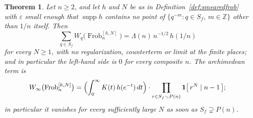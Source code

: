 \documentclass[11pt]{amsart}
\newtheorem{theorem}{Theorem}[section]
\theoremstyle{definition}
\theoremstyle{remark}
\newcommand{\Z}{\mathbb Z}
\newcommand{\Frob}{\operatorname{Frob}}
\newcommand{\supp}{\operatorname{supp}}
\begin{document}
\begin{theorem}\label{thm:frobcontact}
Let $n\ge2$, and let $h$ and $N$ be as in Definition~\ref{def:smearedfrob}
with $\varepsilon$ small enough that $\supp h$ contains no point of
$\{q^{-m}:q\in S_f,\ m\in\Z\}$ other than $1/n$ itself. Then
\begin{equation}\label{eq:frobcontacteq}
  \sum_{q\in S_f}W_q\bigl(\Frob_n^{[h,N]}\bigr)
   =\Lambda(n)\,n^{-1/2}\,h(1/n)
\end{equation}
for every $N\ge1$, with no regularization, counterterm or limit at the
finite places; and in particular the left-hand side is $0$ for
every composite $n$. The archimedean term is
\begin{equation}\label{eq:frobarch}
  W_\infty\bigl(\Frob_n^{[h,N]}\bigr)
   =\Bigl(\int_0^\infty K(t)\,h(e^{-t})\,dt\Bigr)\cdot
     \prod_{r\in S_f\smallsetminus P(n)}\mathbf 1\bigl[\,r^N\mid n-1\,\bigr];
\end{equation}
in particular it vanishes for every sufficiently large $N$ as soon as
$S_f\supsetneq P(n)$.
\end{theorem}
\end{document}

